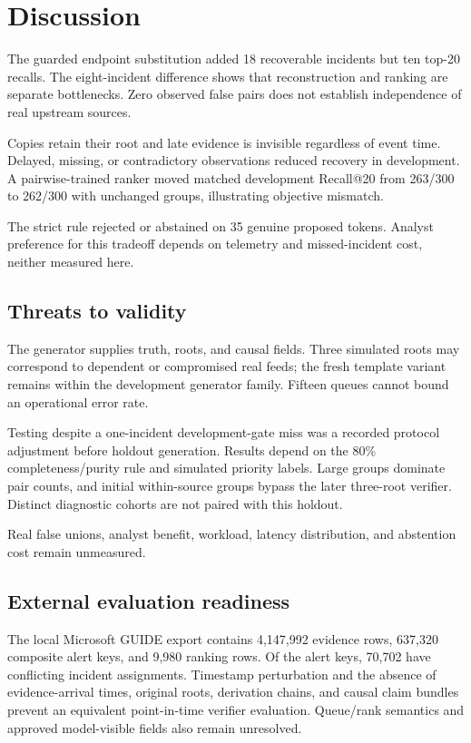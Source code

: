 \documentclass[pdflatex,sn-mathphys-num,iicol]{sn-jnl}
\begin{document}
\section{Discussion}
The guarded endpoint substitution added 18 recoverable incidents but ten top-20 recalls. The eight-incident difference shows that reconstruction and ranking are separate bottlenecks. Zero observed false pairs does not establish independence of real upstream sources.

Copies retain their root and late evidence is invisible regardless of event time. Delayed, missing, or contradictory observations reduced recovery in development. A pairwise-trained ranker moved matched development Recall@20 from 263/300 to 262/300 with unchanged groups, illustrating objective mismatch.

The strict rule rejected or abstained on 35 genuine proposed tokens. Analyst preference for this tradeoff depends on telemetry and missed-incident cost, neither measured here.


\subsection{Threats to validity}
The generator supplies truth, roots, and causal fields. Three simulated roots may correspond to dependent or compromised real feeds; the fresh template variant remains within the development generator family. Fifteen queues cannot bound an operational error rate.

Testing despite a one-incident development-gate miss was a recorded protocol adjustment before holdout generation. Results depend on the 80\% completeness/purity rule and simulated priority labels. Large groups dominate pair counts, and initial within-source groups bypass the later three-root verifier. Distinct diagnostic cohorts are not paired with this holdout.

Real false unions, analyst benefit, workload, latency distribution, and abstention cost remain unmeasured.


\subsection{External evaluation readiness}
The local Microsoft GUIDE export contains 4,147,992 evidence rows, 637,320 composite alert keys, and 9,980 ranking rows. Of the alert keys, 70,702 have conflicting incident assignments. Timestamp perturbation \cite{guide2024} and the absence of evidence-arrival times, original roots, derivation chains, and causal claim bundles prevent an equivalent point-in-time verifier evaluation. Queue/rank semantics and approved model-visible fields also remain unresolved.
\end{document}

